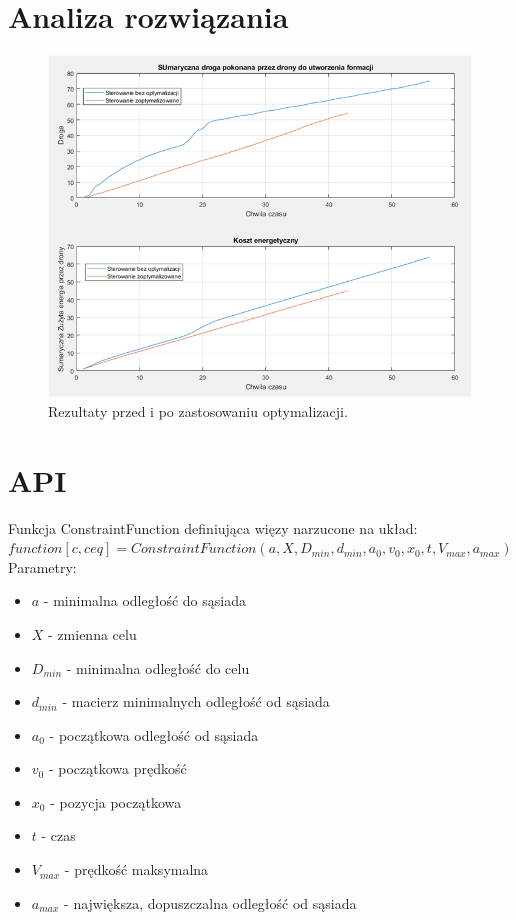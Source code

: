 \documentclass[a4paper, 11pt, oneside]{article}
\begin{document}
\newpage
\section{Analiza rozwiązania}
\begin{figure}[H]
\centering
\includegraphics[scale=0.8]{porownanie.png}
\caption{Rezultaty przed i po zastosowaniu optymalizacji.}
\end{figure}


\newpage
\section{API}
Funkcja ConstraintFunction definiująca więzy narzucone na układ:
\newline
 $function [c,ceq]=ConstraintFunction(a,X,D_{min},d_{min},a_{0},v_{0},x_{0},t,V_{max},a_{max})$\newline
Parametry:
\begin{itemize}
\item $a$ -  minimalna odległość do sąsiada
\item $X$ - zmienna celu
\item $D_{min}$ -  minimalna odległość do celu
\item $d_{min}$ -  macierz minimalnych odległość od sąsiada
\item $a_{0}$ - początkowa odległość od sąsiada
\item $v_{0}$  - początkowa prędkość
\item $x_{0}$ - pozycja początkowa
\item $t$ - czas
\item $V_{max}$ - prędkość maksymalna
\item $a_{max}$ - największa, dopuszczalna odległość od sąsiada
\end{itemize}
\end{document}
